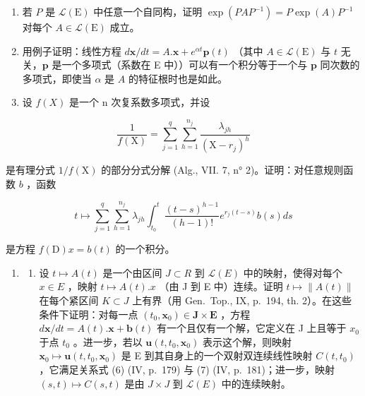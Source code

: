 \begin{enumerate}
\def\labelenumi{\arabic{enumi})}
\setcounter{enumi}{3}
\item
  若 \(P\) 是 \(\mathcal{L}(\mathrm{E})\) 中任意一个自同构，证明 \(\exp(PAP^{-1}) = P\exp(A)P^{-1}\) 对每个 \(A \in \mathcal{L}(\mathrm{E})\) 成立。
\item
  用例子证明：线性方程 \(d\mathbf{x} / dt = A.\mathbf{x} + e^{\alpha t}\mathbf{p}(t)\) （其中 \(A \in \mathcal{L}(\mathrm{E})\) 与 \(t\) 无关，\(\mathbf{p}\) 是一个多项式（系数在 E 中））可以有一个积分等于一个与 \(\mathbf{p}\) 同次数的多项式，即使当 \(\alpha\) 是 \(A\) 的特征根时也是如此。
\item
  设 \(f(X)\) 是一个 n 次复系数多项式，并设
\end{enumerate}

\[
\frac {1}{f (\mathrm{X})} = \sum_ {j = 1} ^ {q} \sum_ {h = 1} ^ {n _ {j}} \frac {\lambda_ {j h}}{(\mathrm{X} - r _ {j}) ^ {h}}
\]

是有理分式 \(1 / f(\mathrm{X})\) 的部分分式分解 (Alg., VII. 7, n° 2)。证明：对任意规则函数 \(b\) ，函数

\[
t \mapsto \sum_ {j = 1} ^ {q} \sum_ {h = 1} ^ {n _ {j}} \lambda_ {j h} \int_ {t _ {0}} ^ {t} \frac {(t - s) ^ {h - 1}}{(h - 1) !} e ^ {r _ {j} (t - s)} b (s) d s
\]

是方程 \(f(\mathrm{D})x = b(t)\) 的一个积分。

\begin{enumerate}
\def\labelenumi{\arabic{enumi})}
\setcounter{enumi}{6}
\tightlist
\item
  \begin{enumerate}
  \def\labelenumii{\alph{enumii})}
  \tightlist
  \item
    设 \(t \mapsto A(t)\) 是一个由区间 \(J \subset R\) 到 \(\mathcal{L}(E)\) 中的映射，使得对每个 \(x \in E\) ，映射 \(t \mapsto A(t).x\) （由 J 到 E 中）连续。证明 \(t \mapsto \|A(t)\|\) 在每个紧区间 \(K \subset J\) 上有界（用 Gen.~Top., IX, p.~194, th. 2）。在这些条件下证明：对每一点 \((t_{0}, \mathbf{x}_{0}) \in \mathbf{J} \times \mathbf{E}\) ，方程 \(d\mathbf{x}/dt = A(t).\mathbf{x} + \mathbf{b}(t)\) 有一个且仅有一个解，它定义在 J 上且等于 \(x_{0}\) 于点 \(t_{0}\) 。进一步，若以 \(\mathbf{u}(t, t_{0}, \mathbf{x}_{0})\) 表示这个解，则映射 \(\mathbf{x}_{0} \mapsto \mathbf{u}(t, t_{0}, \mathbf{x}_{0})\) 是 E 到其自身上的一个双射双连续线性映射 \(C(t, t_{0})\) ，它满足关系式 (6) (IV, p.~179) 与 (7) (IV, p.~181)；进一步，映射 \((s, t) \mapsto C(s, t)\) 是由 \(J \times J\) 到 \(\mathcal{L}(E)\) 中的连续映射。
  \end{enumerate}
\end{enumerate}

